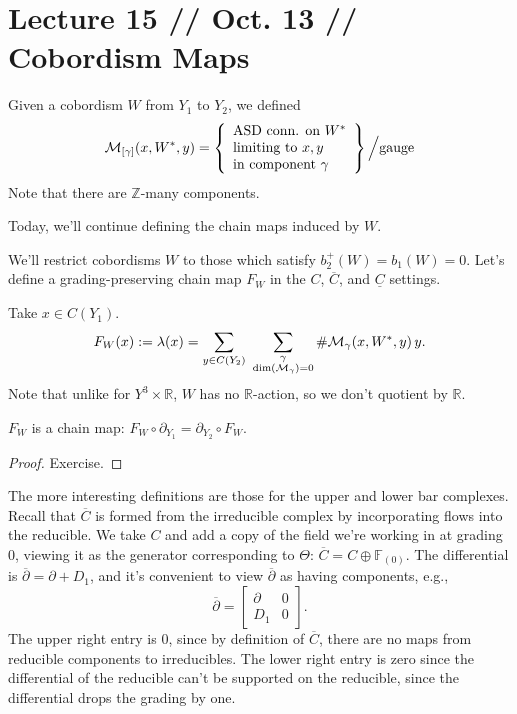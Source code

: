 \documentclass[main]{subfiles}
\begin{document}
\section*{Lecture 15 // Oct. 13 // Cobordism Maps}

\begin{recall}
Given a cobordism $W$ from $Y_1$ to $Y_2$, we defined
\[
\mathcal{M}_{[\gamma]}(x,W^\ast,y) = \left\{\begin{array}{l}\text{ASD conn. on } W^\ast \\ \text{limiting to } x,y \\ \text{in component } \gamma\end{array}\right\}\Big/\text{gauge}
\]
Note that there are $\mathbb{Z}$-many components.
\end{recall}

Today, we'll continue defining the chain maps induced by $W$.

We'll restrict cobordisms $W$ to those which satisfy $b_2^+(W)=b_1(W)=0$. Let's define a grading-preserving chain map $F_W$ in the $C$, $\overline{C}$, and $\underline{C}$ settings.

\begin{definition}
Take $x\in C(Y_1)$.
\[
F_W(x) := \lambda(x) = \sum_{y\in C(Y_2)}\ \sum_{\substack{\gamma \\ \dim(\mc{M}_\gamma)=0}} \#\mc{M}_\gamma(x,W^\ast,y)\, y.
\]
Note that unlike for $Y^3\times\mathbb{R}$, $W$ has no $\mathbb{R}$-action, so we don't quotient by $\mathbb{R}$.
\end{definition}

\begin{proposition}
$F_W$ is a chain map: $F_W\circ\partial_{Y_1} = \partial_{Y_2}\circ F_W$.
\end{proposition}

\begin{proof}
Exercise.
\end{proof}

The more interesting definitions are those for the upper and lower bar complexes. Recall that $\overline{C}$ is formed from the irreducible complex by incorporating flows into the reducible. We take $C$ and add a copy of the field we're working in at grading $0$, viewing it as the generator corresponding to $\Theta$: $\overline{C} = C\oplus\mathbb{F}_{(0)}$. The differential is $\overline{\partial}=\partial+D_1$, and it's convenient to view $\overline{\partial}$ as having components, e.g.,
\[
\overline{\partial} = \begin{bmatrix}\partial & 0\\ D_1 & 0\end{bmatrix}.
\]
The upper right entry is $0$, since by definition of $\overline{C}$, there are no maps from reducible components to irreducibles. The lower right entry is zero since the differential of the reducible can't be supported on the reducible, since the differential drops the grading by one.
\end{document}
